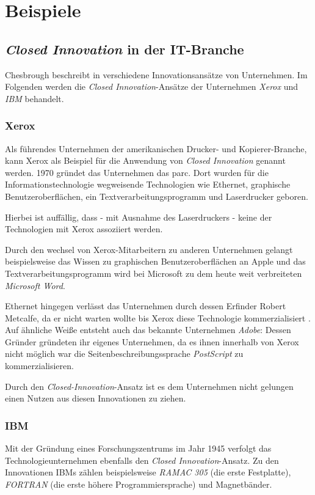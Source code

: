 \section{Beispiele}\label{sec:beispiele}

\subsection{\textit{Closed Innovation} in der IT-Branche}\label{sec:beispiele-unternehmen}
Chesbrough beschreibt in \cite{chesbrough2003} verschiedene Innovationsansätze von Unternehmen.
Im Folgenden werden die \textit{Closed Innovation}-Ansätze der Unternehmen \textit{Xerox} und \textit{IBM} behandelt.

\subsubsection{Xerox \cite[1\psqq]{chesbrough2003}}
Als führendes Unternehmen der amerikanischen Drucker- und Kopierer-Branche,
kann Xerox als Beispiel für die Anwendung von \textit{Closed Innovation} genannt werden.
1970 gründet das Unternehmen das \ac{parc}.
Dort wurden für die Informationstechnologie wegweisende Technologien wie
Ethernet, graphische Benutzeroberflächen, ein Textverarbeitungsprogramm und Laserdrucker geboren.

Hierbei ist auffällig, dass - mit Ausnahme des Laserdruckers - keine der Technologien mit Xerox
assoziiert werden.

Durch den wechsel von Xerox-Mitarbeitern zu anderen Unternehmen
gelangt beispielsweise das Wissen zu graphischen Benutzeroberflächen an Apple
und das Textverarbeitungsprogramm wird bei Microsoft zu dem heute weit verbreiteten \textit{Microsoft Word}.

Ethernet hingegen verlässt das Unternehmen durch dessen Erfinder Robert Metcalfe,
da er nicht warten wollte bis Xerox diese Technologie kommerzialisiert \cite[81]{chesbrough2003}.
Auf ähnliche Weiße entsteht auch das bekannte Unternehmen \textit{Adobe}:
Dessen Gründer gründeten ihr eigenes Unternehmen,
da es ihnen innerhalb von Xerox nicht möglich war
die Seitenbeschreibungssprache \textit{PostScript} zu kommerzialisieren.

Durch den \textit{Closed-Innovation}-Ansatz ist es dem Unternehmen nicht gelungen einen Nutzen aus diesen Innovationen zu ziehen.

\newpage
\subsubsection{IBM \cite[93\psqq]{chesbrough2003}}
Mit der Gründung eines Forschungszentrums im Jahr 1945 verfolgt das Technologieunternehmen ebenfalls den \textit{Closed Innovation}-Ansatz.
Zu den Innovationen IBMs zählen beispielsweise
\textit{RAMAC 305} (die erste Festplatte),
\textit{FORTRAN} (die erste höhere Programmiersprache) und
Magnetbänder.

